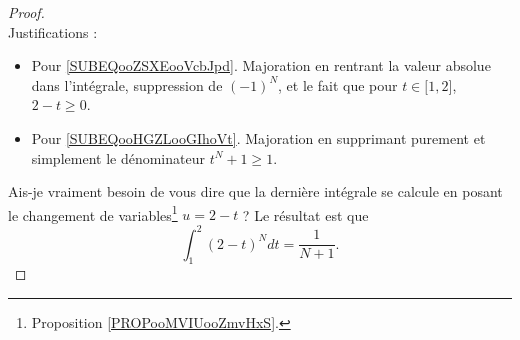 \begin{proof}
\begin{subequations}
    \end{subequations}
    Justifications :
    \begin{itemize}
        \item Pour \ref{SUBEQooZSXEooVcbJpd}. Majoration en rentrant la valeur absolue dans l'intégrale, suppression de \( (-1)^N\), et le fait que pour \( t\in \mathopen[ 1 , 2 \mathclose]\), \( 2-t\geq 0\).
        \item Pour \ref{SUBEQooHGZLooGIhoVt}. Majoration en supprimant purement et simplement le dénominateur \( t^N+1\geq 1\).
    \end{itemize}
    Ais-je vraiment besoin de vous dire que la dernière intégrale se calcule en posant le changement de variables\footnote{Proposition \ref{PROPooMVIUooZmvHxS}.} \( u=2-t\) ? Le résultat est que
    \begin{equation}
        \int_1^2(2-t)^Ndt=\frac{1}{ N+1 }.
    \end{equation}
\end{proof}

